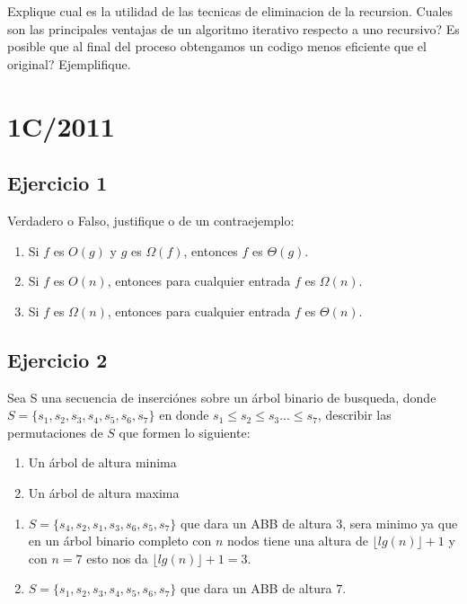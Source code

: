 \documentclass[10pt, a4paper]{article}
\begin{document}
Explique cual es la utilidad de las tecnicas de eliminacion de la recursion. Cuales son las principales ventajas de un algoritmo iterativo respecto a uno recursivo? Es posible que al final del proceso obtengamos un codigo menos eficiente que el original? Ejemplifique.

\newpage
\section{1C/2011}

\subsection*{Ejercicio 1}

Verdadero o Falso, justifique o de un contraejemplo:
\begin{enumerate}
 \item Si $f$ es $O(g)$ y $g$ es $\Omega(f)$, entonces $f$ es $\Theta(g)$.
 \item Si $f$ es $O(n)$, entonces para cualquier entrada $f$ es $\Omega(n)$.
 \item Si $f$ es $\Omega(n)$, entonces para cualquier entrada $f$ es $\Theta(n)$.
\end{enumerate}

\subsection*{Ejercicio 2}

Sea S una secuencia de inserci\'ones sobre un \'arbol binario de busqueda, donde $S = \{ s_1, s_2, s_3, s_4, s_5, s_6, s_7\}$ en donde $s_1 \leq s_2 \leq s_3 ... \leq s_7$, describir las permutaciones de $S$ que formen lo siguiente:
\begin{enumerate}
 \item Un \'arbol de altura minima
 \item Un \'arbol de altura maxima
\end{enumerate}

\begin{enumerate}
 \item $S = \{ s_4, s_2, s_1, s_3, s_6, s_5, s_7\}$ que dara un ABB de altura $3$, sera minimo ya que en un \'arbol binario completo con $n$ nodos tiene una altura de $\lfloor lg(n) \rfloor + 1$ y con $n=7$ esto nos da $\lfloor lg(n) \rfloor + 1 = 3$.
 \item $S = \{ s_1, s_2, s_3, s_4, s_5, s_6, s_7\}$ que dara un ABB de altura $7$.
\end{enumerate}
\end{document}
